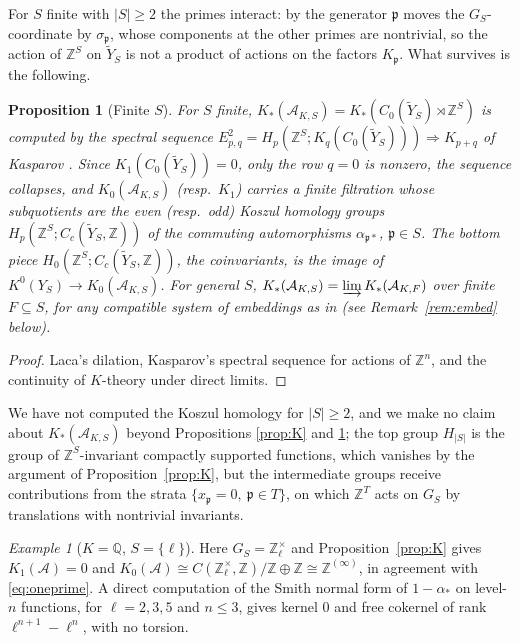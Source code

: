 \documentclass[11pt]{amsart}
\numberwithin{equation}{section}
\newtheorem{proposition}[theorem]{Proposition}
\theoremstyle{definition}
\theoremstyle{remark}
\newtheorem{example}[theorem]{Example}
\newcommand{\Z}{\mathbb{Z}}
\newcommand{\Q}{\mathbb{Q}}
\newcommand{\cA}{\mathcal{A}}
\newcommand{\pp}{\mathfrak{p}}
\begin{document}
For $S$ finite with $|S|\ge2$ the primes interact: by \cite[Lem.~2.10]{Main} the generator
$\pp$ moves the $G_S$-coordinate by $\sigma_\pp$, whose components at the other primes are
nontrivial, so the action of $\Z^S$ on $\widetilde Y_S$ is not a product of actions on
the factors $K_\pp$. What survives is the following.

\begin{proposition}[Finite $S$]\label{prop:Kfinite}
For $S$ finite, $K_*(\cA_{K,S})=K_*(C_0(\widetilde Y_S)\rtimes\Z^S)$ is computed by the
spectral sequence $E^2_{p,q}=H_p(\Z^S;K_q(C_0(\widetilde Y_S)))\Rightarrow K_{p+q}$ of
Kasparov \cite[\S6]{Kasparov}. Since $K_1(C_0(\widetilde Y_S))=0$, only the row $q=0$ is
nonzero, the sequence collapses, and $K_0(\cA_{K,S})$ (resp.\ $K_1$) carries a finite
filtration whose subquotients are the even (resp.\ odd) Koszul homology groups
$H_p(\Z^S;C_c(\widetilde Y_S,\Z))$ of the commuting automorphisms $\alpha_{\pp*}$, $\pp\in S$.
The bottom piece $H_0(\Z^S;C_c(\widetilde Y_S,\Z))$, the coinvariants, is the image of
$K^0(Y_S)\to K_0(\cA_{K,S})$. For general $S$, $K_*(\cA_{K,S})=\varinjlim K_*(\cA_{K,F})$
over finite $F\subseteq S$, for any compatible system of embeddings as in
\cite[Prop.~2.7]{Main} (see Remark~\ref{rem:embed} below).
\end{proposition}

\begin{proof}
Laca's dilation, Kasparov's spectral sequence for actions of $\Z^n$, and the continuity of
$K$-theory under direct limits.
\end{proof}

We have not computed the Koszul homology for $|S|\ge2$, and we make no claim about
$K_*(\cA_{K,S})$ beyond Propositions \ref{prop:K} and \ref{prop:Kfinite}; the top group
$H_{|S|}$ is the group of $\Z^S$-invariant compactly supported functions, which vanishes by
the argument of Proposition~\ref{prop:K}, but the intermediate groups receive contributions
from the strata $\{x_\pp=0,\ \pp\in T\}$, on which $\Z^T$ acts on $G_S$ by translations
with nontrivial invariants.

\begin{example}[$K=\Q$, $S=\{\ell\}$]\label{ex:oneprime}
Here $G_S=\Z_\ell^\times$ and Proposition~\ref{prop:K} gives $K_1(\cA)=0$ and
$K_0(\cA)\cong C(\Z_\ell^\times,\Z)/\Z\oplus\Z\cong\Z^{(\infty)}$, in agreement with
\eqref{eq:oneprime}. A direct computation of the Smith normal form of $1-\alpha_*$ on
level-$n$ functions, for $\ell=2,3,5$ and $n\le3$, gives kernel $0$ and free cokernel of
rank $\ell^{n+1}-\ell^n$, with no torsion.
\end{example}
\end{document}
